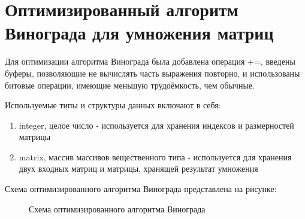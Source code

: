 \section{Оптимизированный алгоритм Винограда для умножения матриц}

Для оптимизации алгоритма Винограда была добавлена операция +=, введены буферы, позволяющие не вычислять часть выражения повторно, и использованы битовые операции, имеющие меньшую трудоёмкость, чем обычные.

Используемые типы и структуры данных включают в себя:
\begin{enumerate}
	\item integer, целое число - используется для хранения индексов и размерностей матрицы
	\item matrix, массив массивов вещественного типа - используется для хранения двух входных матриц и матрицы, хранящей результат умножения
\end{enumerate}

Схема оптимизированного алгоритма Винограда представлена на рисунке:
\begin{figure}[ph!]
	\caption{Схема оптимизированного алгоритма Винограда}
\end{figure}

